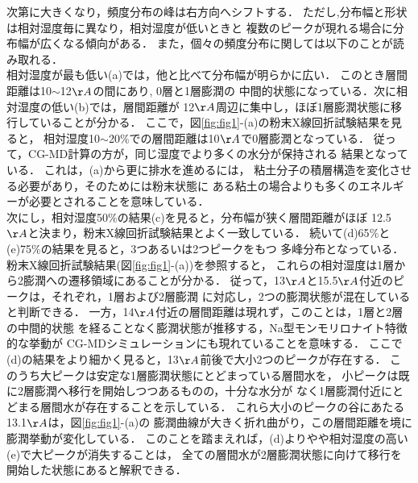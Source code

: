 次第に大きくなり，頻度分布の峰は右方向へシフトする．
ただし,分布幅と形状は相対湿度毎に異なり，相対湿度が低いときと
複数のピークが現れる場合に分布幅が広くなる傾向がある．
また，個々の頻度分布に関しては以下のことが読み取れる．\\
\hspace{\parindent}
相対湿度が最も低い(a)では，他と比べて分布幅が明らかに広い．
このとき層間距離は10$\sim$12$\AA$の間にあり, 0層と1層膨潤の
中間的状態になっている．次に相対湿度の低い(b)では，層間距離が
12$\AA$周辺に集中し，ほぼ1層膨潤状態に移行していることが分かる．
ここで，図\ref{fig:fig1}-(a)の粉末X線回折試験結果を見ると，
相対湿度10$\sim$20$\%$での層間距離は10$\AA$で0層膨潤となっている．
従って，CG-MD計算の方が，同じ湿度でより多くの水分が保持される
結果となっている． これは，(a)から更に排水を進めるには，
粘土分子の積層構造を変化させる必要があり，そのためには粉末状態に
ある粘土の場合よりも多くのエネルギーが必要とされることを意味している．\\
\hspace{\parindent}
次にし，相対湿度50$\%$の結果(c)を見ると，分布幅が狭く層間距離がほぼ
12.5$\AA$と決まり，粉末X線回折試験結果とよく一致している．
続いて(d)65$\%$と(e)75$\%$の結果を見ると，3つあるいは2つピークをもつ
多峰分布となっている．粉末X線回折試験結果(図\ref{fig:fig1}-(a))を参照すると，
これらの相対湿度は1層から2膨潤への遷移領域にあることが分かる．
従って，13$\AA$と15.5$\AA$付近のピークは，それぞれ，1層および2層膨潤
に対応し，2つの膨潤状態が混在していると判断できる．
一方，14$\AA$付近の層間距離は現れず，このことは，1層と2層の中間的状態
を経ることなく膨潤状態が推移する，Na型モンモリロナイト特徴的な挙動が
CG-MDシミュレーションにも現れていることを意味する．
%
ここで(d)の結果をより細かく見ると，13$\AA$前後で大小2つのピークが存在する．
このうち大ピークは安定な1層膨潤状態にとどまっている層間水を，
小ピークは既に2層膨潤へ移行を開始しつつあるものの，十分な水分が
なく1層膨潤付近にとどまる層間水が存在することを示している．
これら大小のピークの谷にあたる13.1$\AA$は，図\ref{fig:fig1}-(a)の
膨潤曲線が大きく折れ曲がり，この層間距離を境に膨潤挙動が変化している．
このことを踏まえれば，(d)よりやや相対湿度の高い(e)で大ピークが消失することは，
全ての層間水が2層膨潤状態に向けて移行を開始した状態にあると解釈できる．
